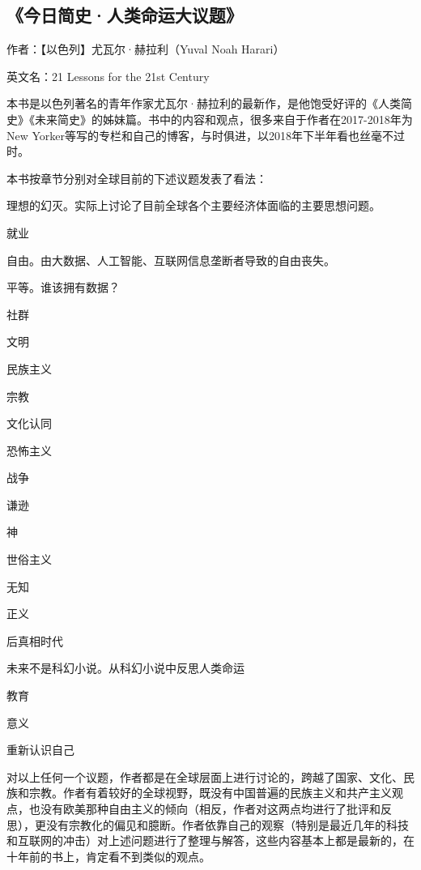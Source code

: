 \subsection{《今日简史·人类命运大议题》}

作者：【以色列】尤瓦尔·赫拉利（Yuval Noah Harari）

英文名：21 Lessons for the 21st Century

本书是以色列著名的青年作家尤瓦尔·赫拉利的最新作，是他饱受好评的《人类简史》《未来简史》的姊妹篇。书中的内容和观点，很多来自于作者在2017-2018年为New Yorker等写的专栏和自己的博客，与时俱进，以2018年下半年看也丝毫不过时。

本书按章节分别对全球目前的下述议题发表了看法：
\begin{itemize*}
	\item 理想的幻灭。实际上讨论了目前全球各个主要经济体面临的主要思想问题。
	\item 就业
	\item 自由。由大数据、人工智能、互联网信息垄断者导致的自由丧失。
	\item 平等。谁该拥有数据？
	\item 社群
	\item 文明
	\item 民族主义
	\item 宗教
	\item 文化认同
	\item 恐怖主义
	\item 战争
	\item 谦逊
	\item 神
	\item 世俗主义
	\item 无知
	\item 正义
	\item 后真相时代
	\item 未来不是科幻小说。从科幻小说中反思人类命运
	\item 教育
	\item 意义
	\item 重新认识自己
\end{itemize*}

对以上任何一个议题，作者都是在全球层面上进行讨论的，跨越了国家、文化、民族和宗教。作者有着较好的全球视野，既没有中国普遍的民族主义和共产主义观点，也没有欧美那种自由主义的倾向（相反，作者对这两点均进行了批评和反思），更没有宗教化的偏见和臆断。作者依靠自己的观察（特别是最近几年的科技和互联网的冲击）对上述问题进行了整理与解答，这些内容基本上都是最新的，在十年前的书上，肯定看不到类似的观点。

